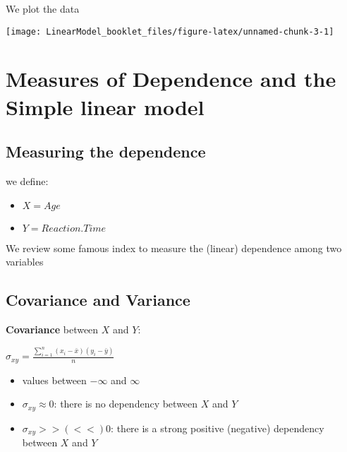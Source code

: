 \documentclass[
]{article}
\newenvironment{Shaded}{\begin{snugshade}}{\end{snugshade}}
\newcommand{\DataTypeTok}[1]{\textcolor[rgb]{0.13,0.29,0.53}{#1}}
\newcommand{\DecValTok}[1]{\textcolor[rgb]{0.00,0.00,0.81}{#1}}
\newcommand{\KeywordTok}[1]{\textcolor[rgb]{0.13,0.29,0.53}{\textbf{#1}}}
\newcommand{\NormalTok}[1]{#1}
\newcommand{\OperatorTok}[1]{\textcolor[rgb]{0.81,0.36,0.00}{\textbf{#1}}}
\providecommand{\tightlist}{%
  \setlength{\itemsep}{0pt}\setlength{\parskip}{0pt}}
\begin{document}
We plot the data

\begin{Shaded}
\end{Shaded}

\begin{center}\texttt{[image: LinearModel\_booklet\_files/figure-latex/unnamed-chunk-3-1]} \end{center}

\hypertarget{measures-of-dependence-and-the-simple-linear-model}{%
\section{Measures of Dependence and the Simple linear
model}\label{measures-of-dependence-and-the-simple-linear-model}}

\hypertarget{measuring-the-dependence}{%
\subsection{Measuring the dependence}\label{measuring-the-dependence}}

we define:

\begin{itemize}
\tightlist
\item
  \(X=Age\)\\
\item
  \(Y=Reaction.Time\)
\end{itemize}

We review some famous index to measure the (linear) dependence among two
variables

\hypertarget{covariance-and-variance}{%
\subsection{Covariance and Variance}\label{covariance-and-variance}}

\textbf{Covariance} between \(X\) and \(Y\):

\(\sigma_{xy}=\frac{\sum_{i=1} ^ n (x_i- \bar{x}) (y_i- \bar{y} )}{n}\)

\begin{itemize}
\tightlist
\item
  values between \(- \infty\) and \(\infty\)\\
\item
  \(\sigma_{xy} \approx 0\): there is no dependency between \(X\) and
  \(Y\)\\
\item
  \(\sigma_{xy} >> (<<) 0\): there is a strong positive (negative)
  dependency between \(X\) and \(Y\)
\end{itemize}
\end{document}
